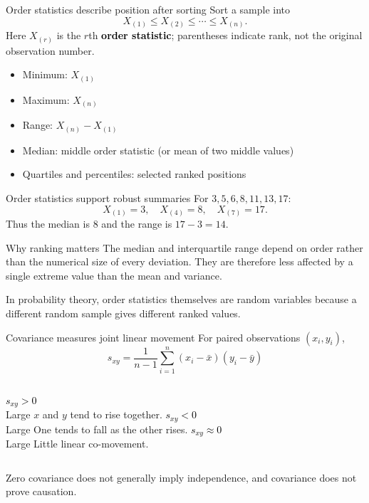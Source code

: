 \documentclass[aspectratio=169,11pt]{beamer}
\newcommand{\key}[1]{\textcolor{black}{\textbf{#1}}}
\begin{document}
\begin{frame}{Order statistics describe position after sorting}
Sort a sample into
\[
X_{(1)}\le X_{(2)}\le\cdots\le X_{(n)}.
\]
Here $X_{(r)}$ is the $r$th \key{order statistic}; parentheses indicate rank, not the original observation number.
\begin{itemize}
  \item Minimum: $X_{(1)}$
  \item Maximum: $X_{(n)}$
  \item Range: $X_{(n)}-X_{(1)}$
  \item Median: middle order statistic (or mean of two middle values)
  \item Quartiles and percentiles: selected ranked positions
\end{itemize}
\end{frame}

\begin{frame}{Order statistics support robust summaries}
For $3,5,6,8,11,13,17$:
\[
X_{(1)}=3,\quad X_{(4)}=8,\quad X_{(7)}=17.
\]
Thus the median is 8 and the range is $17-3=14$.

\medskip
\begin{block}{Why ranking matters}
The median and interquartile range depend on order rather than the numerical size of every deviation. They are therefore less affected by a single extreme value than the mean and variance.
\end{block}
In probability theory, order statistics themselves are random variables because a different random sample gives different ranked values.
\end{frame}

\begin{frame}{Covariance measures joint linear movement}
For paired observations $(x_i,y_i)$,
\[
\boxed{s_{xy}=\frac{1}{n-1}\sum_{i=1}^{n}(x_i-\bar{x})(y_i-\bar{y})}
\]
\begin{columns}[T]
\key{$s_{xy}>0$}\\Large $x$ and $y$ tend to rise together.
\key{$s_{xy}<0$}\\Large One tends to fall as the other rises.
\key{$s_{xy}\approx0$}\\Large Little linear co-movement.
\end{columns}
\medskip
Zero covariance does not generally imply independence, and covariance does not prove causation.
\end{frame}
\end{document}
